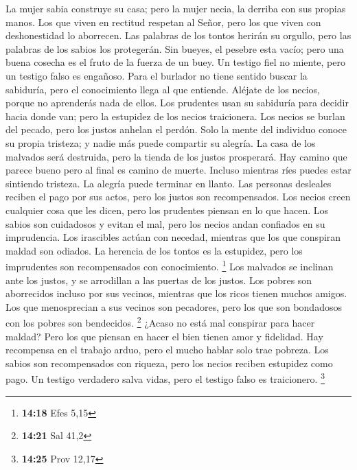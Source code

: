  La mujer sabia construye su casa; pero la mujer necia, la
derriba con sus propias manos.  Los que viven en rectitud
respetan al Señor, pero los que viven con deshonestidad lo aborrecen.
 Las palabras de los tontos herirán su orgullo, pero las
palabras de los sabios los protegerán.  Sin bueyes, el
pesebre esta vacío; pero una buena cosecha es el fruto de la fuerza de
un buey.  Un testigo fiel no miente, pero un testigo falso
es engañoso.  Para el burlador no tiene sentido buscar la
sabiduría, pero el conocimiento llega al que entiende. 
Aléjate de los necios, porque no aprenderás nada de ellos. 
Los prudentes usan su sabiduría para decidir hacia donde van; pero la
estupidez de los necios traicionera.  Los necios se burlan
del pecado, pero los justos anhelan el perdón.  Solo la
mente del individuo conoce su propia tristeza; y nadie más puede
compartir su alegría.  La casa de los malvados será
destruida, pero la tienda de los justos prosperará.  Hay
camino que parece bueno pero al final es camino de muerte. 
Incluso mientras ríes puedes estar sintiendo tristeza. La alegría puede
terminar en llanto.  Las personas desleales reciben el pago
por sus actos, pero los justos son recompensados.  Los
necios creen cualquier cosa que les dicen, pero los prudentes piensan en
lo que hacen.  Los sabios son cuidadosos y evitan el mal,
pero los necios andan confiados en su imprudencia.  Los
irascibles actúan con necedad, mientras que los que conspiran maldad son
odiados.  La herencia de los tontos es la estupidez, pero
los imprudentes son recompensados con conocimiento. \footnote{\textbf{14:18}
  Efes 5,15}  Los malvados se inclinan ante los justos, y
se arrodillan a las puertas de los justos.  Los pobres son
aborrecidos incluso por sus vecinos, mientras que los ricos tienen
muchos amigos.  Los que menosprecian a sus vecinos son
pecadores, pero los que son bondadosos con los pobres son bendecidos.
\footnote{\textbf{14:21} Sal 41,2}  ¿Acaso no está mal
conspirar para hacer maldad? Pero los que piensan en hacer el bien
tienen amor y fidelidad.  Hay recompensa en el trabajo
arduo, pero el mucho hablar solo trae pobreza.  Los sabios
son recompensados con riqueza, pero los necios reciben estupidez como
pago.  Un testigo verdadero salva vidas, pero el testigo
falso es traicionero. \footnote{\textbf{14:25} Prov 12,17} 
